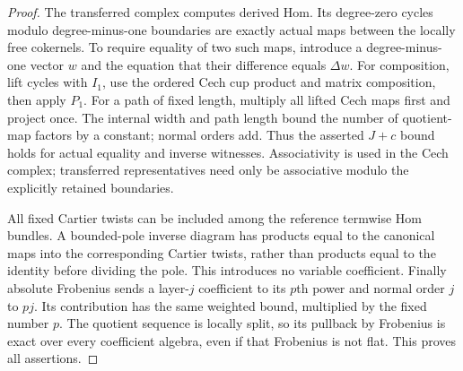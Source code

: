 \begin{proof}
The transferred complex computes derived Hom. Its degree-zero
cycles modulo degree-minus-one boundaries are exactly actual
maps between the locally free cokernels. To require equality
of two such maps, introduce a degree-minus-one vector $w$
and the equation that their difference equals $\Delta w$.
For composition, lift cycles with $I_1$, use the ordered
Cech cup product and matrix composition, then apply $P_1$.
For a path of fixed length, multiply all lifted Cech maps
first and project once. The internal width and path length
bound the number of quotient-map factors by a constant;
normal orders add. Thus the asserted $J+c$ bound holds
for actual equality and inverse witnesses. Associativity
is used in the Cech complex; transferred representatives
need only be associative modulo the explicitly retained
boundaries.

All fixed Cartier twists can be included among the reference
termwise Hom bundles. A bounded-pole inverse diagram has
products equal to the canonical maps into the corresponding
Cartier twists, rather than products equal to the identity
before dividing the pole. This introduces no variable
coefficient. Finally absolute Frobenius sends a layer-$j$
coefficient to its $p$th power and normal order $j$ to $pj$.
Its contribution has the same weighted bound, multiplied
by the fixed number $p$. The quotient sequence is locally
split, so its pullback by Frobenius is exact over every
coefficient algebra, even if that Frobenius is not flat.
This proves all assertions.
\end{proof}

